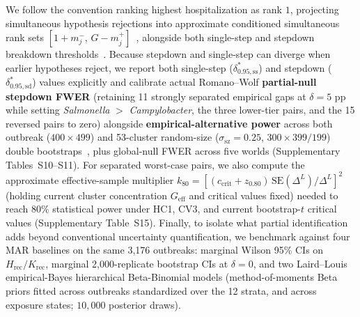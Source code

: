 We follow the convention ranking highest hospitalization as rank $1$, projecting simultaneous hypothesis rejections into approximate conditioned simultaneous rank sets $[1 + m^{-}_j,\, G - m^{+}_j]$~\cite{klein2020joint,mogstad2024inference,almohamad2021simultaneous,almohamad2022simultaneous}, alongside both single-step and stepdown breakdown thresholds~\cite{kline2013sensitivity,masten2020inference}. Because stepdown and single-step can diverge when earlier hypotheses reject, we report both single-step ($\delta^{*}_{0.95,\mathrm{ss}}$) and stepdown ($\delta^{*}_{0.95,\mathrm{sd}}$) values explicitly and calibrate actual Romano--Wolf \textbf{partial-null stepdown FWER} (retaining 11 strongly separated empirical gaps at $\delta=5\text{ pp}$ while setting \textit{Salmonella} $>$ \textit{Campylobacter}, the three lower-tier pairs, and the 15 reversed pairs to zero) alongside \textbf{empirical-alternative power} across both outbreak ($400 \times 499$) and 53-cluster random-size ($\sigma_{\text{sz}}=0.25$, $300 \times 399 / 199$) double bootstraps~\cite{beran1988prepivoting}, plus global-null FWER across five worlds (Supplementary Tables~S10--S11). For separated worst-case pairs, we also compute the approximate effective-sample multiplier $k_{80} = [(c_{\text{crit}} + z_{0.80})\,\mathrm{SE}(\Delta^L)/\Delta^L]^2$ (holding current cluster concentration $G_{\text{eff}}$ and critical values fixed) needed to reach $80\%$ statistical power under HC1, CV3, and current bootstrap-$t$ critical values (Supplementary Table~S15). Finally, to isolate what partial identification adds beyond conventional uncertainty quantification, we benchmark against four MAR baselines on the same 3,176 outbreaks: marginal Wilson 95\% CIs on $H_{\text{rec}}/K_{\text{rec}}$, marginal 2,000-replicate bootstrap CIs at $\delta=0$, and two Laird--Louis~\cite{laird1989empirical} empirical-Bayes hierarchical Beta-Binomial models (method-of-moments Beta priors fitted across outbreaks standardized over the 12 strata, and across exposure states; $10,000$ posterior draws).
